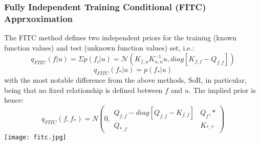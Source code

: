 \documentclass[10pt,sts]{article}
\begin{document}
\begin{multicols}{2}
    \subsubsection{Fully Independent Training Conditional (FITC) Apprxoximation}
    The FITC method defines two independent priors for the training (known function values) and test (unknown function values) set, i.e.:
    $$ q_{FITC}(f | u) = \Sigma p(f_i | u) = \mathcal{N}(K_{f,u}K^{-1}_{u,u}u, diag[K_{f,f} - Q_{f,f}]) $$
    $$ q_{FITC}(f_* | u) = p(f_* | u) $$
    with the most notable difference from the above methods, SoR, in particular, being that no fixed relationship is defined between $f$ and $u$. 
    The implied prior is hence:
    $$ q_{FITC}(f, f_*) = N\left( 0, 
    \begin{matrix}  
        Q_{f, f} - diag[Q_{f,f} - K_{f,f}] & Q_f,* \\
        Q_{*,f} & K_{*,*}
    \end{matrix}
        \right)$$
    \texttt{[image: fitc.jpg]}

% 
% 
% 


\end{multicols}
\end{document}
